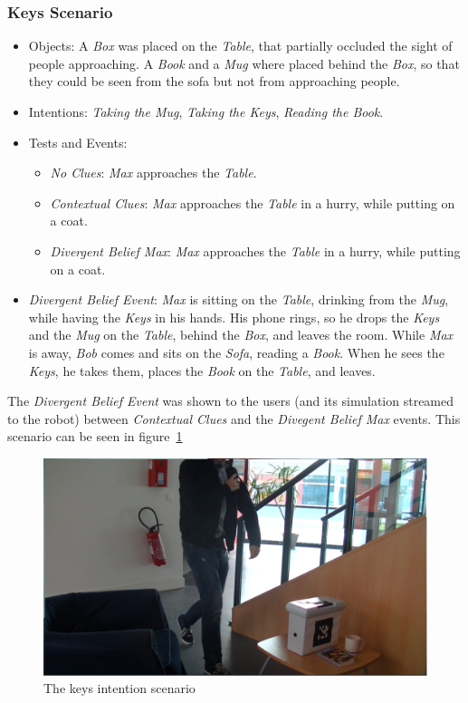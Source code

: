 \subsubsection{Keys Scenario}
\begin{itemize}
\item Objects: A \textit{Box} was placed on the \textit{Table}, that partially occluded the sight of people approaching. A \textit{Book} and a \textit{Mug} where placed behind the \textit{Box}, so that they could be seen from the sofa but not from approaching people.
\item Intentions: \textit{Taking the Mug}, \textit{Taking the Keys}, \textit{Reading the Book}.
\item Tests and Events:
\begin{itemize}
\item \textit{No Clues}: \textit{Max} approaches the \textit{Table}.
\item\textit{Contextual Clues}: \textit{Max} approaches the \textit{Table} in a hurry, while putting on a coat.
\item \textit{Divergent Belief Max}: \textit{Max} approaches the \textit{Table} in a hurry, while putting on a coat.
\end{itemize}
\item \textit{Divergent Belief Event}: \textit{Max} is sitting on the \textit{Table}, drinking from the \textit{Mug}, while having the \textit{Keys} in his hands. His phone rings, so he drops the \textit{Keys} and the \textit{Mug} on the \textit{Table}, behind the \textit{Box}, and leaves the room. While \textit{Max} is away, \textit{Bob} comes and sits on the \textit{Sofa}, reading a \textit{Book}. When he sees the \textit{Keys}, he takes them, places the \textit{Book} on the \textit{Table}, and leaves.
\end{itemize}

The \textit{Divergent Belief Event} was shown to the users (and its simulation streamed to the robot) between \textit{Contextual Clues} and the \textit{Divegent Belief Max} events. This scenario can be seen in figure~\ref{fig:situation_assessment-keys}

 \begin{figure}[ht!]
	\centering
	\includegraphics[scale=0.5]{img/situation_assessment/keys2-blur.pdf}
	\caption{The keys intention scenario}
	\label{fig:situation_assessment-keys}
\end{figure}


